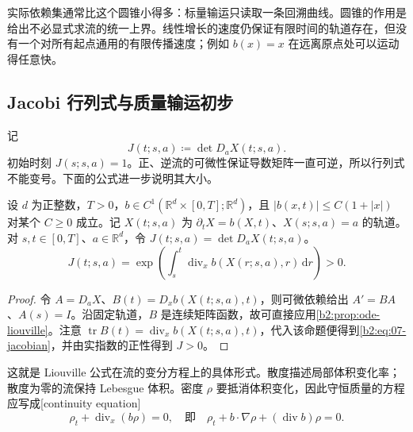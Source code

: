 实际依赖集通常比这个圆锥小得多：标量输运只读取一条回溯曲线。圆锥的作用是给出不必显式求流的统一上界。线性增长的速度仍保证有限时间的轨道存在，但没有一个对所有起点通用的有限传播速度；例如 \(b(x)=x\) 在远离原点处可以运动得任意快。

\subsection{Jacobi 行列式与质量输运初步}
\label{b2:subsec:070304}

记
\[
 J(t;s,a)\coloneqq\det D_aX(t;s,a).
\]
初始时刻 \(J(s;s,a)=1\)。正、逆流的可微性保证导数矩阵一直可逆，所以行列式不能变号。下面的公式进一步说明其大小。

\begin{proposition}[Liouville 公式]\label{b2:prop:07-jacobian}
设 \(d\) 为正整数，\(T>0\)，\(b\in C^1(\mathbb R^d\times[0,T];\mathbb R^d)\)，且 \(|b(x,t)|\leq C(1+|x|)\) 对某个 \(C\geq0\) 成立。记 \(X(t;s,a)\) 为 \(\partial_tX=b(X,t)\)、\(X(s;s,a)=a\) 的轨道。对 \(s,t\in[0,T]\)、\(a\in\mathbb R^d\)，令 \(J(t;s,a)=\det D_aX(t;s,a)\)。
\begin{equation}\label{b2:eq:07-jacobian}
 J(t;s,a)=\exp\left(\int_s^t\operatorname{div}_xb(X(r;s,a),r)\,\mathrm dr\right)>0.
\end{equation}
\end{proposition}
\begin{proof}
令 \(A=D_aX\)、\(B(t)=D_xb(X(t;s,a),t)\)，则可微依赖给出 \(A'=BA\)、\(A(s)=I\)。沿固定轨道，\(B\) 是连续矩阵函数，故可直接应用\cref{b2:prop:ode-liouville}。注意 \(\operatorname{tr}B(t)=\operatorname{div}_xb(X(t;s,a),t)\)，代入该命题便得到\eqref{b2:eq:07-jacobian}，并由实指数的正性得到 \(J>0\)。
\end{proof}

这就是 Liouville 公式在流的变分方程上的具体形式。散度描述局部体积变化率；散度为零的流保持 Lebesgue 体积。密度 \(\rho\) 要抵消体积变化，因此守恒质量的方程应写成[continuity equation]
\begin{equation}\label{b2:eq:07-continuity}
 \rho_t+\operatorname{div}_x(b\rho)=0,
 \quad\text{即}\quad
 \rho_t+b\cdot\nabla\rho+(\operatorname{div}b)\rho=0.
\end{equation}


